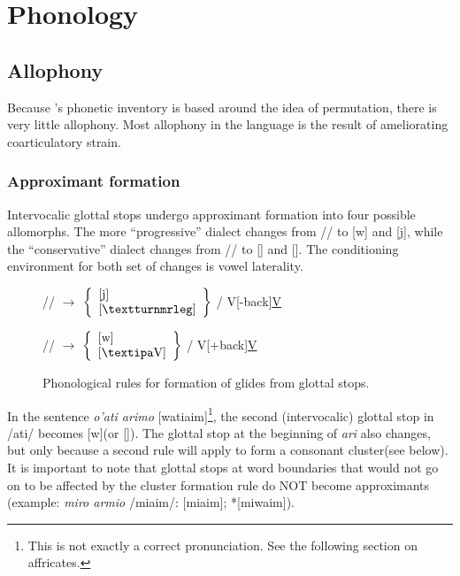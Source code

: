 \chapter{Phonology}
\label{chap:phono}

\section{Allophony}

Because \kurango's phonetic inventory is based around the idea of permutation, there is very little allophony. Most allophony in the language is the result of ameliorating coarticulatory strain.

	\subsection{Approximant formation}
		Intervocalic glottal stops undergo approximant formation into four possible allomorphs. The more ``progressive'' dialect changes from /\glot/ to [w] and [j], while the ``conservative'' dialect changes from /\glot/ to [\W] and [\M]. The conditioning environment for both set of changes is vowel laterality.

		\begin{figure}[H]
		\label{glides}
		\centering
		/\glot/ $\longrightarrow$ $\left\{ \begin{array}{l} \text{[j]}\\ \text{[\M]} \end{array}\right\}$ / V[-back]\uline V

		/\glot/ $\longrightarrow$ $\left\{ \begin{array}{l} \text{[w]}\\ \text{[\W]} \end{array}\right\}$ / V[+back]\uline V
		\caption{Phonological rules for formation of glides from glottal stops.}
		\end{figure}

 		In the sentence \emph{o'ati arimo} [\glot\OO wati\glot a\R im\OO]\footnote{This is not exactly a correct pronunciation. See the following section on affricates.}, the second (intervocalic) glottal stop in /\glot\OO\glot ati/ becomes [w](or [\W]). The glottal stop at the beginning of \emph{ari} also changes, but only because a second rule will apply to form a consonant cluster(see below). It is important to note that glottal stops at word boundaries that would not go on to be affected by the cluster formation rule do NOT become approximants (example: \emph{miro armio} /mi\R\OO\glot a\R im\OO/: [mi\R\OO\glot a\R im\OO]; *[mi\R wa\R im\OO]).

